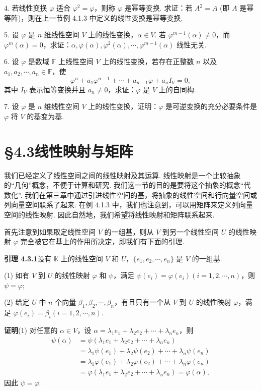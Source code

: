 \documentclass[UTF8,12pt,a4paper,fontset=fandol]{ctexart}
\begin{document}
4. 若线性变换 $\varphi$ 适合 $\varphi^2=\varphi$，则称 $\varphi$ 是幂等变换. 求证：若 $A^2=A$ (即 $A$ 是幂等阵)，则在上一节例 4.1.3 中定义的线性变换是幂等变换.

5. 设 $\varphi$ 是 $n$ 维线性空间 $V$ 上的线性变换，$\alpha\in V$. 若 $\varphi^{m-1}(\alpha)\neq 0$，而 $\varphi^m(\alpha)=0$，求证：$\alpha,\varphi(\alpha),\varphi^2(\alpha),\cdots,\varphi^{m-1}(\alpha)$ 线性无关.

6. 设 $\varphi$ 是数域 $\mathbb{F}$ 上线性空间 $V$ 上的线性变换，若存在正整数 $n$ 以及 $a_1,a_2,\cdots,a_n\in\mathbb{F}$，使
\[
\varphi^n+a_1\varphi^{n-1}+\cdots+a_{n-1}\varphi+a_nI_V=0,
\]
其中 $I_V$ 表示恒等变换并且 $a_n\neq 0$，求证：$\varphi$ 是 $V$ 上的自同构.

7. 设 $\varphi$ 是 $n$ 维线性空间 $V$ 上的线性变换，证明：$\varphi$ 是可逆变换的充分必要条件是 $\varphi$ 将 $V$ 的基变为基.

\section*{§4.3\quad 线性映射与矩阵}

我们已经定义了线性空间之间的线性映射及其运算. 线性映射是一个比较抽象的“几何”概念，不便于计算和研究. 我们这一节的目的是要将这个抽象的概念“代数化”. 我们在第三章中通过引进线性空间的基，将抽象的线性空间和行向量空间或列向量空间联系了起来. 在例 4.1.3 中，我们也注意到，可以用矩阵来定义列向量空间的线性映射. 因此自然地，我们希望将线性映射和矩阵联系起来.

首先注意到如果取定线性空间 $V$ 的一组基，则从 $V$ 到另一个线性空间 $U$ 的线性映射 $\varphi$ 完全被它在基上的作用所决定，即我们有下面的引理.

\noindent\textbf{引理 4.3.1}\quad 设有 $\mathbb{K}$ 上的线性空间 $V$ 和 $U$，$\{e_1,e_2,\cdots,e_n\}$ 是 $V$ 的一组基.

(1) 如有 $V$ 到 $U$ 的线性映射 $\varphi$ 和 $\psi$，满足 $\psi(e_i)=\varphi(e_i)(i=1,2,\cdots,n)$，则 $\psi=\varphi$;

(2) 给定 $U$ 中 $n$ 个向量 $\beta_1,\beta_2,\cdots,\beta_n$，有且只有一个从 $V$ 到 $U$ 的线性映射 $\varphi$，满足 $\varphi(e_i)=\beta_i(i=1,2,\cdots,n)$.

\noindent\textbf{证明}\quad (1) 对任意的 $\alpha\in V$，设 $\alpha=\lambda_1e_1+\lambda_2e_2+\cdots+\lambda_ne_n$，则
\[
\begin{aligned}
\psi(\alpha)
&=\psi(\lambda_1e_1+\lambda_2e_2+\cdots+\lambda_ne_n)\\
&=\lambda_1\psi(e_1)+\lambda_2\psi(e_2)+\cdots+\lambda_n\psi(e_n)\\
&=\lambda_1\varphi(e_1)+\lambda_2\varphi(e_2)+\cdots+\lambda_n\varphi(e_n)\\
&=\varphi(\lambda_1e_1+\lambda_2e_2+\cdots+\lambda_ne_n)=\varphi(\alpha),
\end{aligned}
\]
因此 $\psi=\varphi$.
\end{document}
